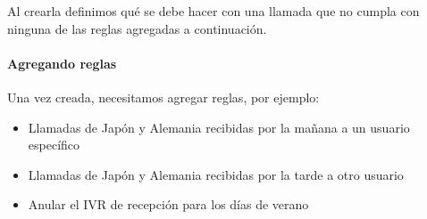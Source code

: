 \documentclass[letterpaper,10pt,spanish]{sphinxmanual}
\begin{document}
Al crearla definimos qué se debe hacer con una llamada que no cumpla con ninguna de las reglas agregadas a continuación.


\paragraph{Agregando reglas}
\label{administration_portal/client/vpbx/routing_endpoints/conditional_routes:adding-rules}
Una vez creada, necesitamos agregar reglas, por ejemplo:
\begin{itemize}
\item {} 
Llamadas de Japón y Alemania recibidas por la mañana a un usuario específico

\item {} 
Llamadas de Japón y Alemania recibidas por la tarde a otro usuario

\item {} 
Anular el IVR de recepción para los días de verano

\end{itemize}
\end{document}
